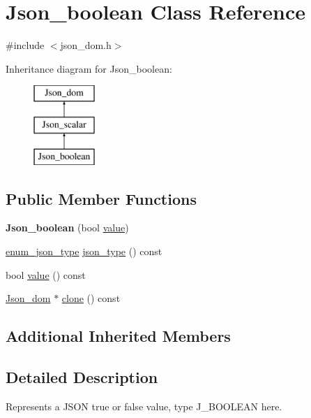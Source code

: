 \hypertarget{classJson__boolean}{}\section{Json\+\_\+boolean Class Reference}
\label{classJson__boolean}


{\ttfamily \#include $<$json\+\_\+dom.\+h$>$}

Inheritance diagram for Json\+\_\+boolean\+:\begin{figure}[H]
\begin{center}
\leavevmode
\includegraphics[height=3.000000cm]{classJson__boolean}
\end{center}
\end{figure}
\subsection*{Public Member Functions}
\begin{DoxyCompactItemize}
\item 
\mbox{\label{classJson__boolean_a324075331c7fae57aadcae93b941c432}} 
{\bfseries Json\+\_\+boolean} (bool \mbox{\hyperlink{classJson__boolean_a166bd3e20239ed1506982a1f072fbc37}{value}})
\item 
\mbox{\hyperlink{classJson__dom_af37eed7dfe1da1d6507d3ab85320eb03}{enum\+\_\+json\+\_\+type}} \mbox{\hyperlink{classJson__boolean_a75cc6ab22cb10abd773eec0bce0308ee}{json\+\_\+type}} () const
\item 
bool \mbox{\hyperlink{classJson__boolean_a166bd3e20239ed1506982a1f072fbc37}{value}} () const
\item 
\mbox{\hyperlink{classJson__dom}{Json\+\_\+dom}} $\ast$ \mbox{\hyperlink{classJson__boolean_a4af266d49e532a2155e68a5b9fbcbff9}{clone}} () const
\end{DoxyCompactItemize}
\subsection*{Additional Inherited Members}


\subsection{Detailed Description}
Represents a J\+S\+ON true or false value, type J\+\_\+\+B\+O\+O\+L\+E\+AN here. 

